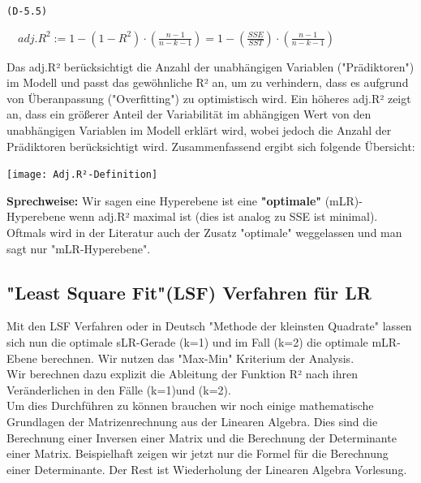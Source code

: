 \documentclass[12pt]{article}
\begin{document}
\begin{center}
\texttt{(D-5.5)}
\begin{large}
\textbf{$ \quad adj.R^2 := 1 - (1 - R^2) \cdot (\frac{n-1}{n-k-1}) = 1 - (\frac{SSE}{SST}) \cdot (\frac{n-1}{n-k-1}) $}  \\[0.6cm] 
\end{large}     
\end{center}
%
Das adj.R² berücksichtigt die Anzahl der unabhängigen Variablen ("Prädiktoren") im Modell und passt das gewöhnliche R² an, um zu verhindern, dass es aufgrund von Überanpassung ("Overfitting") zu optimistisch wird. Ein höheres adj.R² zeigt an, dass ein größerer Anteil der Variabilität im abhängigen Wert von den unabhängigen Variablen im Modell erklärt wird, wobei jedoch die Anzahl der Prädiktoren berücksichtigt wird. Zusammenfassend ergibt sich folgende Übersicht:\\

\begin{center}
\texttt{[image: Adj.R²-Definition]}\\
\end{center}
%
\textbf{Sprechweise:} Wir sagen eine Hyperebene ist eine \textbf{"optimale"} (mLR)- Hyperebene wenn adj.R² maximal ist (dies ist analog zu SSE ist minimal). Oftmals wird in der Literatur auch der Zusatz "optimale" weggelassen und man sagt nur "mLR-Hyperebene".\\ 




\subsection{"Least Square Fit"(LSF) Verfahren für LR}

Mit den LSF Verfahren oder in Deutsch "Methode der kleinsten Quadrate" lassen sich nun die optimale sLR-Gerade (k=1) und im Fall (k=2) die optimale mLR-Ebene berechnen. Wir nutzen das "Max-Min" Kriterium der Analysis.\\
Wir berechnen dazu explizit die Ableitung der Funktion R² nach ihren Veränderlichen in den Fälle (k=1)und (k=2).\\
Um dies Durchführen zu können brauchen wir noch einige mathematische Grundlagen der Matrizenrechnung aus der Linearen Algebra. Dies sind die Berechnung einer Inversen einer Matrix und die Berechnung der Determinante einer Matrix. Beispielhaft zeigen wir jetzt nur die Formel für die Berechnung einer Determinante. Der Rest ist Wiederholung der Linearen Algebra Vorlesung.
%
\end{document}
